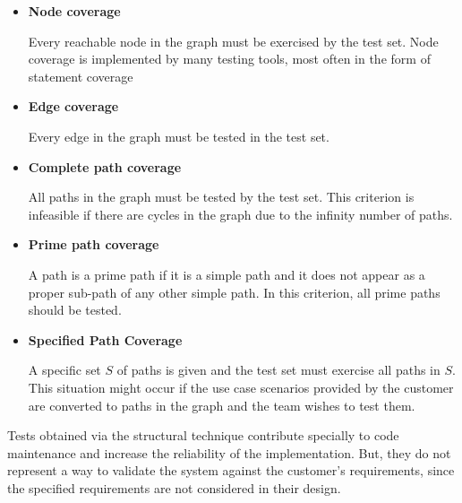 	\begin{itemize}
	\item \textbf{Node coverage}

	Every reachable node in the graph must be exercised by the test set. Node coverage is implemented by many testing tools, most often in the form of statement coverage
	
	\item \textbf{Edge coverage}

	Every edge in the graph must be tested in the test set.
	\item \textbf{Complete path coverage}

	All paths in the graph must be tested by the test set. This criterion is infeasible if there are cycles in the graph due to the infinity number of paths.

	\item \textbf{Prime path coverage}

	A path is a prime path if it is a simple path and it does not appear as a proper sub-path of any other simple path. In this criterion, all prime paths should be tested.

	\item \textbf{Specified Path Coverage}

	A specific set $S$ of paths is given and the test set must exercise all paths in $S$. This situation might occur if the use case scenarios provided by the customer are converted to paths in the graph and the team wishes to test them. 
	\end{itemize}

Tests obtained via the structural technique contribute specially to code maintenance and increase the reliability of the implementation. But, they do not represent a way to validate the system against the customer's requirements, since the specified requirements are not considered in their design.

